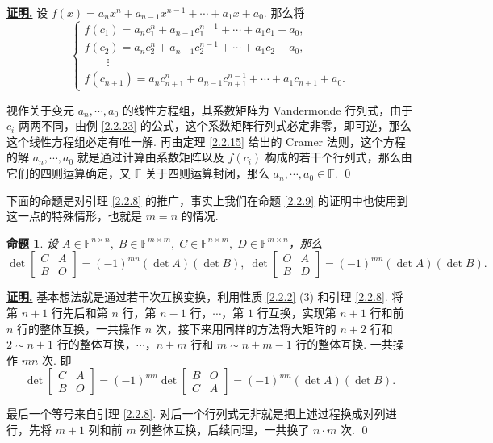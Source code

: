 \documentclass[10pt,openany]{article}
\theoremstyle{thmstyle} %
\theoremstyle{defstyle} %
\theoremstyle{prostyle} %
\newtheorem{proposition}[theorem]{命题}
\theoremstyle{exastyle}
\theoremstyle{remstyle}
\renewenvironment{proof}[1][证明]{\par\underline{\textbf{#1.}} \;\fangsong}{\qed\par}
\newcommand{\F}{\mathbb{F}}
\newcommand{\n}{^{n \times n}}
\newcommand{\mn}{^{m \times n}}
\newcommand{\nm}{^{n \times m}}
\begin{document}
\begin{proof}
	设 \( f(x)=a_nx^n+a_{n-1}x^{n-1}+\cdots+a_1x+a_0 \). 那么将
	\[ \left\{ \begin{array}{l}
		f(c_1)=a_nc_1^{n}+a_{n-1}c_1^{n-1}+\cdots+a_1c_1+a_0, \\
		f(c_2)=a_nc_2^{n}+a_{n-1}c_2^{n-1}+\cdots+a_1c_2+a_0, \\
		\qquad \vdots \\
		f(c_{n+1})=a_nc_{n+1}^{n}+a_{n-1}c_{n+1}^{n-1}+\cdots+a_1c_{n+1}+a_0.
	\end{array}\right. \]
	
	视作关于变元 \( a_{n},\cdots,a_0 \) 的线性方程组，其系数矩阵为 Vandermonde 行列式，由于 \( c_i \) 两两不同，由例 \ref{2.2.23} 的公式，这个系数矩阵行列式必定非零，即可逆，那么这个线性方程组必定有唯一解. 再由定理 \ref{2.2.15} 给出的 Cramer 法则，这个方程的解 \( a_{n},\cdots,a_0 \) 就是通过计算由系数矩阵以及 \( f(c_i) \) 构成的若干个行列式，那么由它们的四则运算确定，又 \( \F \) 关于四则运算封闭，那么 \( a_{n},\cdots,a_0 \in \F \).
\end{proof}

下面的命题是对引理 \ref{2.2.8} 的推广，事实上我们在命题 \ref{2.2.9} 的证明中也使用到这一点的特殊情形，也就是 \( m=n \) 的情况. 

\begin{proposition} \label{2.2.25}
    设 \( A \in \F\n, \; B \in \F^{m \times m}, \; C \in \F\nm, \; D \in \F\mn \)，那么
    \[ 
    \det\begin{bmatrix} 
    	C & A \\
    	 B & O 
    	\end{bmatrix}= (-1)^{mn} (\det A)(\det B), \; 
    \det\begin{bmatrix} 
    	O & A \\
    	 B & D
    \end{bmatrix}= (-1)^{mn} (\det A)(\det B). \]
    
\end{proposition}

\begin{proof}
	基本想法就是通过若干次互换变换，利用性质 \ref{2.2.2} (3) 和引理 \ref{2.2.8}. 将第 \( n+1 \) 行先后和第 \( n \) 行，第 \( n-1 \) 行，\( \cdots \)，第 \( 1 \) 行互换，实现第 \( n+1 \) 行和前 \( n \) 行的整体互换，一共操作 \( n \) 次，接下来用同样的方法将大矩阵的 \( n+2 \) 行和 \( 2 \sim n+1 \) 行的整体互换，\( \cdots \)，\( n+m \) 行和 \( m \sim n+m-1 \) 行的整体互换. 一共操作 \( mn \) 次. 即
	\[ \det\begin{bmatrix} 
		C & A \\
		B & O 
	\end{bmatrix}= (-1)^{mn}\det\begin{bmatrix} 
	B & O \\
	C & A 
	\end{bmatrix}= (-1)^{mn} (\det A)(\det B). \]
	
	最后一个等号来自引理 \ref{2.2.8}. 对后一个行列式无非就是把上述过程换成对列进行，先将 \( m+1 \) 列和前 \( m \) 列整体互换，后续同理，一共换了 \( n \cdot m \) 次.
\end{proof}
\end{document}
